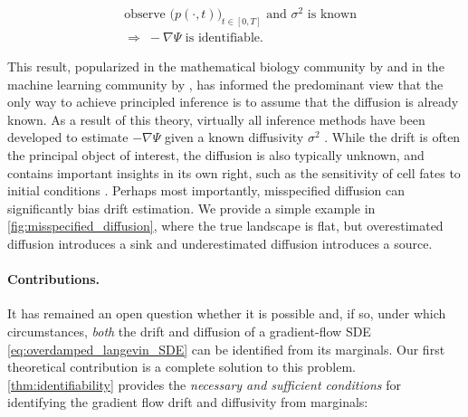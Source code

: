 \documentclass[twoside]{article}
\makeatletter
\newenvironment{aistatsboxedeq}[2][orange!6]{%
  \begin{mdframed}[hidealllines=true,backgroundcolor=#1,
    innerleftmargin=#2pt, innerrightmargin=#2pt,
    innertopmargin=6pt, innerbottommargin=6pt]
    \@fleqnfalse\@mathmargin\z@
    \begin{equation}
}{%
    \end{equation}
  \end{mdframed}
}
\makeatother
\begin{document}
\begin{aistatsboxedeq}[orange!6]{6} %
\begin{aligned}
&\text{observe } \bigl(p(\cdot,t)\bigr)_{t\in[0,T]} \text{ and } \sigma^2 \text{ is known}\\
&\Longrightarrow\; -\nabla \Psi \text{ is identifiable}.
\label{eq:previous_identifiability}
\end{aligned}
\end{aistatsboxedeq}
\newpage
This result, popularized in the mathematical biology community by \citet{weinreb2018fundamental} and in the machine learning community by \citet{hashimoto2016learning}, has informed the predominant view that the only way to achieve principled inference is to assume that the diffusion is already known. As a result of this theory, virtually all inference methods have been developed to estimate $-\nabla \Psi$ given a known diffusivity $\sigma^2$ \citep{hashimoto2016learning, neklyudov2023action, lavenant2021towards, yeo2021generative, zhang2021optimal, chizat2022trajectory,  bunne2022proximal, shen2025multi,zhang2024joint}.
While the drift is often the principal object of interest, 
the diffusion is also typically unknown, and contains important insights in its own right, such as the sensitivity of cell fates to initial conditions \citep{forrow2024consistent}. Perhaps most importantly, misspecified diffusion can significantly bias drift estimation. We provide a simple example in \cref{fig:misspecified_diffusion}, where the true landscape is flat, but overestimated diffusion introduces a sink and underestimated diffusion introduces a source. 

\paragraph{Contributions.} 
It has remained an open question whether it is possible and, if so, under which circumstances, \emph{both} the drift and diffusion of a gradient-flow SDE \eqref{eq:overdamped_langevin_SDE} can be identified from its marginals. Our first theoretical contribution is a complete solution to this problem. \cref{thm:identifiability} provides the \emph{necessary and sufficient conditions} for identifying the gradient flow drift and diffusivity from marginals:
\end{document}
